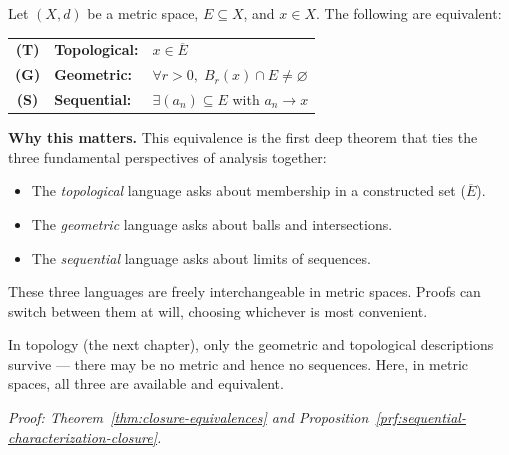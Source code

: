 
\bigskip

\begin{tcolorbox}[
  colback=violet!6,
  colframe=violet!60!black,
  arc=4pt,
  left=10pt, right=10pt, top=8pt, bottom=8pt,
  title={\small\textbf{The Unifying Theorem: Three Languages for Closure}},
  fonttitle=\small\bfseries
]
\label{thm:closure-three-way-unifying}

Let $(X,d)$ be a metric space, $E \subseteq X$, and $x \in X$.
The following are equivalent:

\medskip
\begin{center}
\renewcommand{\arraystretch}{1.5}
\begin{tabular}{c l l}
\textbf{(T)} & \textbf{Topological:} & $x \in \overline{E}$ \\
\textbf{(G)} & \textbf{Geometric:}   & $\forall r > 0,\; B_r(x) \cap E \neq \varnothing$ \\
\textbf{(S)} & \textbf{Sequential:}  & $\exists (a_n) \subseteq E$ with $a_n \to x$
\end{tabular}
\end{center}

\medskip
\noindent
\textbf{Why this matters.}
This equivalence is the first deep theorem that ties the three fundamental
perspectives of analysis together:

\begin{itemize}
  \item The \emph{topological} language asks about membership in a constructed set ($\overline{E}$).
  \item The \emph{geometric} language asks about balls and intersections.
  \item The \emph{sequential} language asks about limits of sequences.
\end{itemize}
These three languages are freely interchangeable in metric spaces.
Proofs can switch between them at will, choosing whichever is most convenient.

In topology (the next chapter), only the geometric and topological descriptions
survive --- there may be no metric and hence no sequences.
Here, in metric spaces, all three are available and equivalent.

\medskip
\noindent\textit{Proof: Theorem~\ref{thm:closure-equivalences} and
Proposition~\ref{prf:sequential-characterization-closure}.}
\end{tcolorbox}



